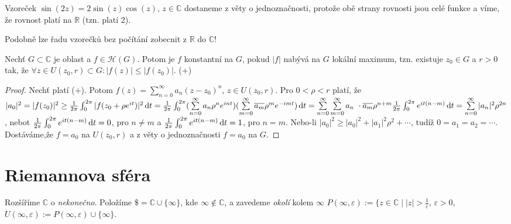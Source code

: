 \begin{example}
Vzoreček $\sin (2z)=2\sin (z) \cos (z)$, $z \in \mathbb{C}$ dostaneme z věty o jednoznačnosti, protože obě strany rovnosti jsou celé funkce a víme, že rovnost platí na $\mathbb{R}$ (tzn. platí 2).
\end{example}

\begin{note}
Podobně lze řadu vzorečků bez počítání zobecnit z $\mathbb{R}$ do $\mathbb{C}$!
\end{note}

\begin{theorem}
Nechť $G \subset \mathbb{C}$ je oblast a $f\in \mathcal{H}(G)$. Potom je $f$ konstantní na $G$, pokud $|f|$ nabývá na $G$ lokální maximum, tzn. existuje $z_0 \in G$ a $r>0$ tak, že $\forall z \in U(z_0,r) \subset G: |f(z)| \leq |f(z_0)|$. (+)
\end{theorem}

\begin{proof}
Nechť platí (+). Potom $f(z)=\sum\limits_{n=0}^\infty a_n(z-z_0)^{n}$, $z\in U(z_0,r)$. Pro $0<\rho<r$ platí, že $|a_0|^2=|f(z_0)|^2\geq \frac{1}{2 \pi} \int_{0}^{2 \pi} |f(z_0+\rho e^{it})|^2 \diff t=%
\frac{1}{2 \pi} \int_{0}^{2 \pi} (\sum\limits_{n=0}^\infty a_n \rho^n e^{int})(\sum\limits_{m=0}^\infty \overline{a_m} \rho^m e^{-imt}) \diff t=%
\sum\limits_{n=0}^\infty \sum\limits_{m=0}^\infty a_n\ \cdot \overline{a_m} \rho^{n+m} \frac{1}{2 \pi} \int_{0}^{2 \pi}  e^{it(n-m)} \diff t=\sum\limits_{n=0}^\infty |a_n|^2\rho^{2n}$, nebot $\frac{1}{2 \pi} \int_{0}^{2 \pi}  e^{it(n-m)} \mathop{}\!\mathrm{d} t=0$, pro $n\neq m$ a \newline $\frac{1}{2 \pi} \int_{0}^{2 \pi}  e^{it(n-m)} \mathop{}\!\mathrm{d} t=1$, pro $n=m$.
Nebo-li $|a_0|^2\geq|a_0|^2+|a_1|^2\rho^2+\cdots$, tudíž $0=a_1=a_2=\cdots$. Dostáváme,že $f=a_0$ na $U(z_0,r)$ a z věty o jednoznačnosti $f=a_0$ na $G$.
\end{proof}

\section{\texorpdfstring{Riemannova sféra}{Riemannova sféra}}
Rozšíříme $\mathbb{C}$ o \emph{nekonečno}.
Položíme $\$=\mathbb{C}\cup\{\infty\}$, kde $\infty\notin\mathbb{C}$, a zavedeme \emph{okolí} kolem $\infty$
$P(\infty,\varepsilon):=\{z\in\mathbb{C}\mid |z|>\frac{1}{\varepsilon}$, $\varepsilon>0$,
$U(\infty,\varepsilon):=P(\infty,\varepsilon)\cup \{\infty\}$.


